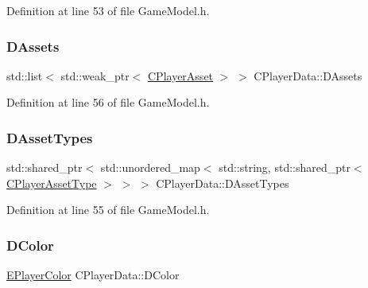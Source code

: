 Definition at line 53 of file Game\+Model.\+h.

\hypertarget{classCPlayerData_a1d7dd355facf52db6242e3554373906c}{}\label{classCPlayerData_a1d7dd355facf52db6242e3554373906c} 
\subsubsection{\texorpdfstring{D\+Assets}{DAssets}}
{\footnotesize\ttfamily std\+::list$<$ std\+::weak\+\_\+ptr$<$ \hyperlink{classCPlayerAsset}{C\+Player\+Asset} $>$ $>$ C\+Player\+Data\+::\+D\+Assets\hspace{0.3cm}{\ttfamily [protected]}}



Definition at line 56 of file Game\+Model.\+h.

\hypertarget{classCPlayerData_ad922f283c60b1c885dac955815ae2b05}{}\label{classCPlayerData_ad922f283c60b1c885dac955815ae2b05} 
\subsubsection{\texorpdfstring{D\+Asset\+Types}{DAssetTypes}}
{\footnotesize\ttfamily std\+::shared\+\_\+ptr$<$ std\+::unordered\+\_\+map$<$ std\+::string, std\+::shared\+\_\+ptr$<$ \hyperlink{classCPlayerAssetType}{C\+Player\+Asset\+Type} $>$ $>$ $>$ C\+Player\+Data\+::\+D\+Asset\+Types\hspace{0.3cm}{\ttfamily [protected]}}



Definition at line 55 of file Game\+Model.\+h.

\hypertarget{classCPlayerData_a65d69aaa09c8fc0f7ddfa5e858313085}{}\label{classCPlayerData_a65d69aaa09c8fc0f7ddfa5e858313085} 
\subsubsection{\texorpdfstring{D\+Color}{DColor}}
{\footnotesize\ttfamily \hyperlink{GameDataTypes_8h_aafb0ca75933357ff28a6d7efbdd7602f}{E\+Player\+Color} C\+Player\+Data\+::\+D\+Color\hspace{0.3cm}{\ttfamily [protected]}}



